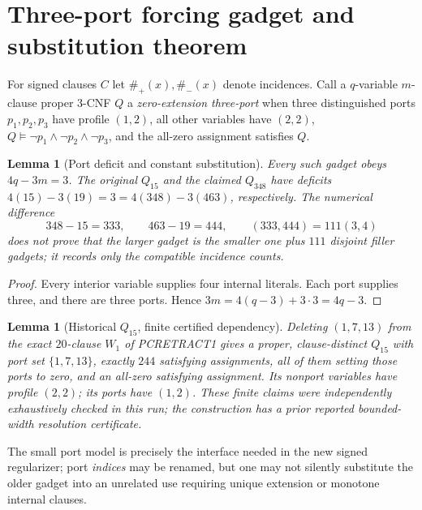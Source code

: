 \documentclass[11pt]{article}
\newtheorem{lemma}[theorem]{Lemma}
\begin{document}
\section{Three-port forcing gadget and substitution theorem}
For signed clauses \(C\) let \(\#_+(x),\#_-(x)\) denote incidences.
Call a \(q\)-variable \(m\)-clause proper 3-CNF \(Q\)
a \emph{zero-extension three-port} when three distinguished ports
\(p_1,p_2,p_3\) have profile \((1,2)\), all other variables have
\((2,2)\), \(Q\models\neg p_1\land\neg p_2\land\neg p_3\), and
the all-zero assignment satisfies \(Q\).
\begin{lemma}[Port deficit and constant substitution]
Every such gadget obeys \(4q-3m=3\).
The original \(Q_{15}\) and the claimed \(Q_{348}\) have deficits
\(4(15)-3(19)=3=4(348)-3(463)\), respectively.
The numerical difference
\[
348-15=333,\qquad463-19=444,\qquad
(333,444)=111(3,4)
\]
does \emph{not} prove that the larger gadget is the smaller one plus
\(111\) disjoint filler gadgets; it records only the compatible
incidence counts.
\end{lemma}
\begin{proof}
Every interior variable supplies four internal literals. Each port
supplies three, and there are three ports. Hence
\(3m=4(q-3)+3\cdot3=4q-3\).
\end{proof}
\begin{lemma}[Historical \(Q_{15}\), finite certified dependency]
Deleting \((1,7,13)\) from the exact \(20\)-clause \(W_1\) of
PCRETRACT1 gives a proper, clause-distinct \(Q_{15}\) with port set
\(\{1,7,13\}\), exactly \(244\) satisfying assignments, all of them
setting those ports to zero, and an all-zero satisfying assignment.
Its nonport variables have profile \((2,2)\);
its ports have \((1,2)\). These finite claims were independently
exhaustively checked in this run; the construction has a prior
reported bounded-width resolution certificate.
\end{lemma}
The small port model is precisely the interface needed in the new
signed regularizer; port \emph{indices} may be renamed, but one may not
silently substitute the older gadget into an unrelated use requiring
unique extension or monotone internal clauses.
\end{document}
